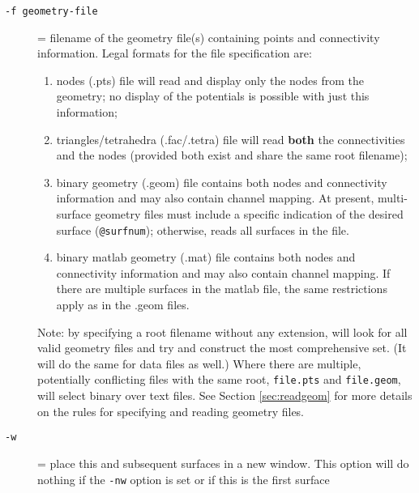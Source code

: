 \begin{description}
  \item[{\tt -f geometry-file} ]
    = filename of the geometry file(s) containing points and
    connectivity information.   Legal formats for the file specification 
    are: 
    \begin{enumerate}
      \item nodes (.pts) file will read and display only the 
        nodes from the geometry; no display of the potentials is 
        possible with just this information;
        
      \item triangles/tetrahedra (.fac/.tetra) file will read 
        \textbf{both} the connectivities and the nodes (provided
        both exist and share the same root filename);
        
      \item binary geometry (.geom) file contains both nodes and 
        connectivity information and may also contain channel
        mapping.  At present, multi-surface geometry files must
        include a specific indication of the desired surface
        (\texttt{@surfnum}); otherwise, \map{} reads all surfaces
        in the file.  
      \item binary matlab geometry (.mat) file contains both nodes and 
        connectivity information and may also contain channel
        mapping.  If there are multiple surfaces in the matlab
        file, the same restrictions apply as in the .geom files.
    \end{enumerate}
    Note: by specifying a root filename without any extension, \map{} will
    look for all valid geometry files and try and construct the most
    comprehensive set.  (It will do the same for data files as well.)
    Where there are multiple, potentially
    conflicting files with the same root, \eg{} \texttt{file.pts} and
    \texttt{file.geom}, \map{} will select binary over text files.  
    See Section \ref{sec:readgeom} for more details on the rules for
    specifying and reading geometry files.  
    
  \item[{\tt-w}] = place this and subsequent surfaces in a new window.
    This option will do nothing if the \texttt{-nw} option is set or if
    this is the first surface
    
    

\end{description}
